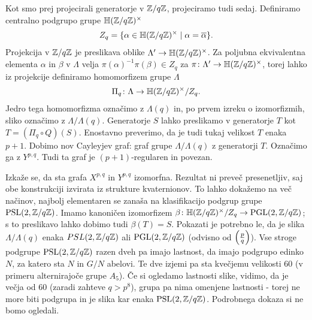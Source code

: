 Kot smo prej projecirali generatorje v \(\mathbb Z/q\mathbb Z\), projeciramo tudi sedaj. Definiramo centralno podgrupo grupe \(\mathbb H(\mathbb Z/q\mathbb Z)^\times\)
\begin{align*}
    Z_q = \{\alpha \in \mathbb H(\mathbb Z/q\mathbb Z)^\times \mid \alpha = \overline\alpha\}.
\end{align*}
Projekcija v \(\mathbb Z/q\mathbb Z\) je preslikava oblike \(\Lambda' \to\mathbb H(\mathbb Z/q\mathbb Z)^\times\). Za poljubna ekvivalentna elementa \(\alpha\) in \(\beta\) v \(\Lambda\) velja \(\pi(\alpha)^{-1}\pi(\beta)\in Z_q\) za \(\pi\colon \Lambda' \to\mathbb H(\mathbb Z/q\mathbb Z)^\times\), torej lahko iz projekcije definiramo homomorfizem grupe \(\Lambda\)
\begin{align*}
    \Pi_q\colon \Lambda \to \mathbb H(\mathbb Z/q\mathbb Z)^\times/Z_q.
\end{align*}
Jedro tega homomorfizma označimo z \(\Lambda(q)\) in, po prvem izreku o izomorfizmih, sliko označimo z \(\Lambda/\Lambda(q)\). Generatorje \(S\) lahko preslikamo v generatorje \(T\) kot \(T=(\Pi_q \circ Q)(S)\). Enostavno preverimo, da je tudi tukaj velikost \(T\) enaka \(p+1\). Dobimo nov Cayleyjev graf: graf grupe \(\Lambda/\Lambda(q)\) z generatorji \(T\). Označimo ga z \(Y^{p,q}\). Tudi ta graf je \((p+1)\)-regularen in povezan.

Izkaže se, da sta grafa \(X^{p,q}\) in \(Y^{p,q}\) izomorfna. Rezultat ni preveč presenetljiv, saj obe konstrukciji izvirata iz strukture kvaternionov. To lahko dokažemo na več načinov, najbolj elementaren se zanaša na klasifikacijo podgrup grupe \(\operatorname{PSL}(2, \mathbb Z/q\mathbb Z)\). Imamo kanoničen izomorfizem \(\beta\colon\mathbb H(\mathbb Z/q\mathbb Z)^\times /Z_q\to \operatorname{PGL}(2, \mathbb Z/q\mathbb Z)\); s to preslikavo lahko dobimo tudi \(\beta(T)=S\). Pokazati je potrebno le, da je slika \(\Lambda/\Lambda(q)\) enaka \(PSL(2, \mathbb Z/q\mathbb Z)\) ali \(\operatorname{PGL}(2, \mathbb Z/q\mathbb Z)\) (odvisno od \(\left(\frac{p}{q}\right)\)). Vse stroge podgrupe \(\operatorname{PSL}(2, \mathbb Z/q\mathbb Z)\) razen dveh pa imajo lastnost, da imajo podgrupo edinko \(N\), za katero sta \(N\) in \(G/N\) abelovi. Te dve izjemi pa sta kvečjemu velikosti 60 (v primeru alternirajoče grupe \(A_5\)). Če si ogledamo lastnosti slike, vidimo, da je večja od \(60\) (zaradi zahteve \(q>p^8\)), grupa pa nima omenjene lastnosti - torej ne more biti podgrupa in je slika kar enaka \(\operatorname{PSL}(2, \mathbb Z/q\mathbb Z)\). Podrobnega dokaza si ne bomo ogledali.


